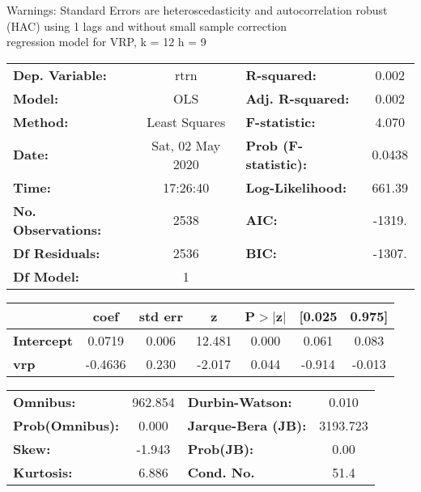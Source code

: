 Warnings: \newline
 [1] Standard Errors are heteroscedasticity and autocorrelation robust (HAC) using 1 lags and without small sample correction\\ 

regression model for VRP, k = 12 h = 9\begin{center}
\begin{tabular}{lclc}
\toprule
\textbf{Dep. Variable:}    &       rtrn       & \textbf{  R-squared:         } &     0.002   \\
\textbf{Model:}            &       OLS        & \textbf{  Adj. R-squared:    } &     0.002   \\
\textbf{Method:}           &  Least Squares   & \textbf{  F-statistic:       } &     4.070   \\
\textbf{Date:}             & Sat, 02 May 2020 & \textbf{  Prob (F-statistic):} &   0.0438    \\
\textbf{Time:}             &     17:26:40     & \textbf{  Log-Likelihood:    } &    661.39   \\
\textbf{No. Observations:} &        2538      & \textbf{  AIC:               } &    -1319.   \\
\textbf{Df Residuals:}     &        2536      & \textbf{  BIC:               } &    -1307.   \\
\textbf{Df Model:}         &           1      & \textbf{                     } &             \\
\bottomrule
\end{tabular}
\begin{tabular}{lcccccc}
                   & \textbf{coef} & \textbf{std err} & \textbf{z} & \textbf{P$> |$z$|$} & \textbf{[0.025} & \textbf{0.975]}  \\
\midrule
\textbf{Intercept} &       0.0719  &        0.006     &    12.481  &         0.000        &        0.061    &        0.083     \\
\textbf{vrp}       &      -0.4636  &        0.230     &    -2.017  &         0.044        &       -0.914    &       -0.013     \\
\bottomrule
\end{tabular}
\begin{tabular}{lclc}
\textbf{Omnibus:}       & 962.854 & \textbf{  Durbin-Watson:     } &    0.010  \\
\textbf{Prob(Omnibus):} &   0.000 & \textbf{  Jarque-Bera (JB):  } & 3193.723  \\
\textbf{Skew:}          &  -1.943 & \textbf{  Prob(JB):          } &     0.00  \\
\textbf{Kurtosis:}      &   6.886 & \textbf{  Cond. No.          } &     51.4  \\
\bottomrule
\end{tabular}
\end{center}

